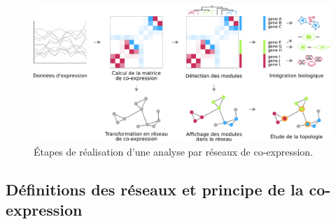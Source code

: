 \begin{figure}[ht]
    \centering
    \includegraphics[width=\textwidth]{img/intro/3_coexpr/intro_3_coexpr_principle.pdf}
    \caption[Étapes de réalisation d'une analyse par réseaux de co-expression.]{Étapes de réalisation d'une analyse par réseaux de co-expression.}
    \label{fig:coexpr_pipeline}
\end{figure}



\subsection{Définitions des réseaux et principe de la co-expression}

